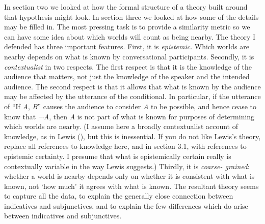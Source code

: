 \documentclass[
  10pt,
  letterpaper,
  DIV=11,
  numbers=noendperiod,
  twoside]{scrartcl}
\begin{document}
In section two we looked at how the formal structure of a theory built
around that hypothesis might look. In section three we looked at how
some of the details may be filled in. The most pressing task is to
provide a similarity metric so we can have some idea about which worlds
will count as being nearby. The theory I defended has three important
features. First, it is \emph{epistemic}. Which worlds are nearby depends
on what is known by conversational participants. Secondly, it is
\emph{contextualist} in two respects. The first respect is that it is
the knowledge of the audience that matters, not just the knowledge of
the speaker and the intended audience. The second respect is that it
allows that what is known by the audience may be affected by the
utterance of the conditional. In particular, if the utterance of ``If
\emph{A}, \emph{B}'' causes the audience to consider \emph{A} to be
possible, and hence cease to know that ¬\emph{A}, then \emph{A} is not
part of what is known for purposes of determining which worlds are
nearby. (I assume here a broadly contextualist account of knowledge, as
in Lewis (), but this is inessential. If
you do not like Lewis's theory, replace all references to knowledge
here, and in section 3.1, with references to epistemic certainty. I
presume that what is epistemically certain really is contextually
variable in the way Lewis suggests.) Thirdly, it is \emph{coarse-
grained}: whether a world is nearby depends only on whether it is
consistent with what is known, not `how much' it agrees with what is
known. The resultant theory seems to capture all the data, to explain
the generally close connection between indicatives and subjunctives, and
to explain the few differences which do arise between indicatives and
subjunctives.
\end{document}
